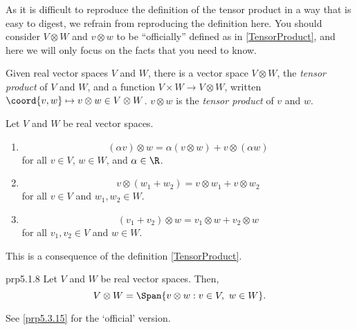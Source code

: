 As it is difficult to reproduce the definition of the tensor product in a way that is easy to digest, we refrain from reproducing the definition here.  You should consider $V\otimes W$ and $v\otimes w$ to be ``officially'' defined as in \cref{TensorProduct}, and here we will only focus on the facts that you need to know.
\begin{important}
	Given real vector spaces $V$ and $W$, there is a vector space $V\otimes W$, the \emph{tensor product} of $V$ and $W$, and a function $V\times W\rightarrow V\otimes W$, written $\coord{v,w}\mapsto v\otimes w\in V\otimes W$.  $v\otimes w$ is the \emph{tensor product} of $v$ and $w$.
\end{important}
\begin{prp}{}{}
	Let $V$ and $W$ be real vector spaces.
	\begin{enumerate}
		\item
		\begin{equation}
			(\alpha v)\otimes w=\alpha (v\otimes w)+v\otimes (\alpha w)
		\end{equation}
		for all $v\in V$, $w\in W$, and $\alpha \in \R$.
		\item
		\begin{equation}
			v\otimes (w_1+w_2)=v\otimes w_1+v\otimes w_2
		\end{equation}
		for all $v\in V$ and $w_1,w_2\in W$.
		\item
		\begin{equation}
			(v_1+v_2)\otimes w=v_1\otimes w+v_2\otimes w
		\end{equation}
		for all $v_1,v_2\in V$ and $w\in W$.
	\end{enumerate}
	\begin{rmk}
		This is a consequence of the definition \cref{TensorProduct}.
	\end{rmk}
\end{prp}
\begin{prp}{}{prp5.1.8}
Let $V$ and $W$ be real vector spaces.  Then,
\begin{equation}
V\otimes W =\Span \{ v\otimes w:v\in V,\ w\in W\} .
\end{equation}
\begin{rmk}
	See \cref{prp5.3.15} for the `official' version.
\end{rmk}
\end{prp}


